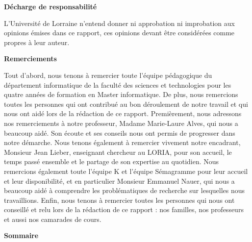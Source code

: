 \documentclass[11pt]{article}
\begin{document}
\thispagestyle{empty}
\begin{center}
{\bfseries \huge D\'echarge de responsabilit\'e}
\end{center}
\vspace*{10mm}

L'Universit\'{e} de Lorraine n'entend donner ni approbation ni improbation aux opinions \'{e}mises dans ce rapport, ces opinions devant \^{e}tre consid\'{e}r\'{e}es comme propres \`{a} leur auteur.
\cleardoublepage


\thispagestyle{empty}
\begin{center}
{\bfseries \huge Remerciements}
\end{center}
\vspace*{10mm}

Tout d'abord, nous tenons \`{a} remercier toute l'\'{e}quipe p\'{e}dagogique du d\'{e}partement informatique de la facult\'{e} des sciences et technologies pour les quatre ann\'{e}es de formation en Master informatique.
\newline
De plus, nous remercions toutes les personnes qui ont contribu\'{e} au bon d\'{e}roulement de notre travail et qui nous ont aid\'{e} lors de la r\'{e}daction de ce rapport. Premi\`{e}rement, nous adressons nos remerciements \`{a} notre professeur, Madame Marie-Laure Alves, qui nous a beaucoup aid\'{e}. Son \'{e}coute et ses conseils nous ont permis de progresser dans notre d\'{e}marche.
\newline
Nous tenons \'{e}galement \`{a} remercier vivement notre encadrant, Monsieur Jean Lieber, enseignant chercheur au LORIA, pour son accueil, le temps pass\'{e} ensemble et le partage de son expertise au quotidien. Nous remercions \'{e}galement toute l'\'{e}quipe K et l'\'{e}quipe S\'{e}magramme pour leur accueil et leur disponibilit\'{e}, et en particulier Monsieur Emmanuel Nauer, qui nous a beaucoup aid\'{e} \`{a} comprendre les probl\'{e}matiques de recherche sur lesquelles nous travaillions. Enfin, nous tenons \`{a} remercier toutes les personnes qui nous ont conseill\'{e} et relu lors de la r\'{e}daction de ce rapport : nos familles, nos professeurs et aussi nos camarades de cours.

\cleardoublepage


\thispagestyle{empty}
\begin{center}
{\bfseries \huge Sommaire}
\end{center}
\tableofcontents
\end{document}
